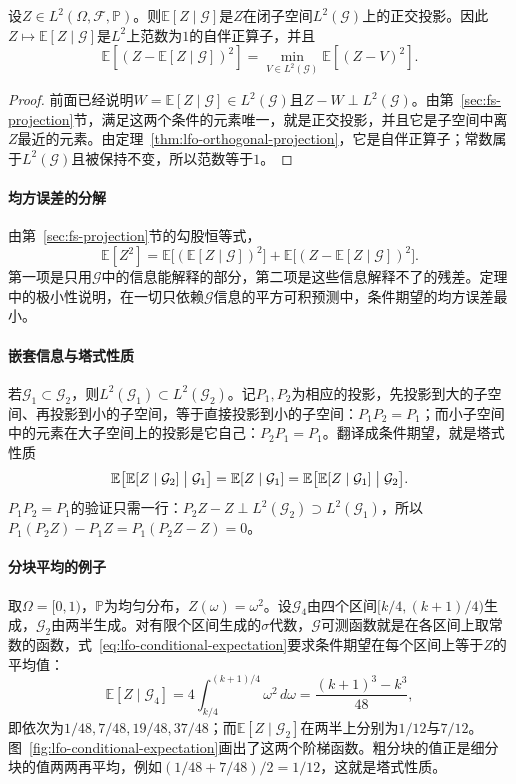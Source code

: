\begin{theorem}[条件期望是正交投影]
\label{thm:lfo-conditional-expectation-projection}
设$Z\in L^2(\Omega,\mathcal F,\mathbb P)$。则$\mathbb E[Z\mid\mathcal G]$是$Z$在闭子空间$L^2(\mathcal G)$上的正交投影。因此$Z\mapsto\mathbb E[Z\mid\mathcal G]$是$L^2$上范数为$1$的自伴正算子，并且
\[
 \mathbb E[(Z-\mathbb E[Z\mid\mathcal G])^2]=\min_{V\in L^2(\mathcal G)}\mathbb E[(Z-V)^2] .
\]
\end{theorem}

\begin{proof}
前面已经说明$W=\mathbb E[Z\mid\mathcal G]\in L^2(\mathcal G)$且$Z-W\perp L^2(\mathcal G)$。由第~\ref{sec:fs-projection}节，满足这两个条件的元素唯一，就是正交投影，并且它是子空间中离$Z$最近的元素。由定理~\ref{thm:lfo-orthogonal-projection}，它是自伴正算子；常数属于$L^2(\mathcal G)$且被保持不变，所以范数等于$1$。
\end{proof}

\paragraph{均方误差的分解}
由第~\ref{sec:fs-projection}节的勾股恒等式，
\[
 \mathbb E[Z^2]=\mathbb E\bigl[(\mathbb E[Z\mid\mathcal G])^2\bigr]+\mathbb E\bigl[(Z-\mathbb E[Z\mid\mathcal G])^2\bigr].
\]
第一项是只用$\mathcal G$中的信息能解释的部分，第二项是这些信息解释不了的残差。定理中的极小性说明，在一切只依赖$\mathcal G$信息的平方可积预测中，条件期望的均方误差最小。

\paragraph{嵌套信息与塔式性质}
若$\mathcal G_1\subset\mathcal G_2$，则$L^2(\mathcal G_1)\subset L^2(\mathcal G_2)$。记$P_1,P_2$为相应的投影，先投影到大的子空间、再投影到小的子空间，等于直接投影到小的子空间：$P_1P_2=P_1$；而小子空间中的元素在大子空间上的投影是它自己：$P_2P_1=P_1$。翻译成条件期望，就是塔式性质
\[
 \mathbb E\bigl[\mathbb E[Z\mid\mathcal G_2]\bigm|\mathcal G_1\bigr]=\mathbb E[Z\mid\mathcal G_1]=\mathbb E\bigl[\mathbb E[Z\mid\mathcal G_1]\bigm|\mathcal G_2\bigr].
\]
$P_1P_2=P_1$的验证只需一行：$P_2Z-Z\perp L^2(\mathcal G_2)\supset L^2(\mathcal G_1)$，所以$P_1(P_2Z)-P_1Z=P_1(P_2Z-Z)=0$。

\paragraph{分块平均的例子}
取$\Omega=[0,1)$，$\mathbb P$为均匀分布，$Z(\omega)=\omega^2$。设$\mathcal G_4$由四个区间$[k/4,(k+1)/4)$生成，$\mathcal G_2$由两半生成。对有限个区间生成的$\sigma$代数，$\mathcal G$可测函数就是在各区间上取常数的函数，式~\eqref{eq:lfo-conditional-expectation}要求条件期望在每个区间上等于$Z$的平均值：
\[
 \mathbb E[Z\mid\mathcal G_4]=4\int_{k/4}^{(k+1)/4}\omega^2\,d\omega=\frac{(k+1)^3-k^3}{48},
\]
即依次为$1/48,7/48,19/48,37/48$；而$\mathbb E[Z\mid\mathcal G_2]$在两半上分别为$1/12$与$7/12$。图~\ref{fig:lfo-conditional-expectation}画出了这两个阶梯函数。粗分块的值正是细分块的值两两再平均，例如$(1/48+7/48)/2=1/12$，这就是塔式性质。

